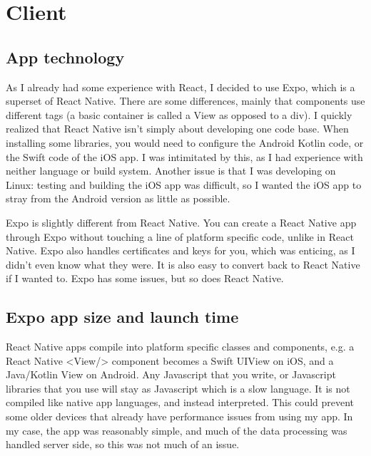 \documentclass{l4proj}
\begin{document}
\section{Client}
\subsection{App technology}
As I already had some experience with React, I decided to use Expo, which is a superset of React Native. There are some differences, mainly that components use different tags (a basic container is called a View as opposed to a div). I quickly realized that React Native isn't simply about developing one code base. When installing some libraries, you would need to configure the Android Kotlin code, or the Swift code of the iOS app. I was intimitated by this, as I had experience with neither language or build system. Another issue is that I was developing on Linux: testing and building the iOS app was difficult, so I wanted the iOS app to stray from the Android version as little as possible.

Expo is slightly different from React Native. You can create a React Native app through Expo without touching a line of platform specific code, unlike in React Native. Expo also handles certificates and keys for you, which was enticing, as I didn't even know what they were. It is also easy to convert back to React Native if I wanted to. Expo has some issues, but so does React Native. 

\subsection{Expo app size and launch time}
React Native apps compile into platform specific classes and components, e.g. a React Native <View/> component becomes a Swift UIView on iOS, and a Java/Kotlin View on Android. Any Javascript that you write, or Javascript libraries that you use will stay as Javascript which is a slow language. It is not compiled like native app languages, and instead interpreted. This could prevent some older devices that already have performance issues from using my app. In my case, the app was reasonably simple, and much of the data processing was handled server side, so this was not much of an issue. 
\end{document}
